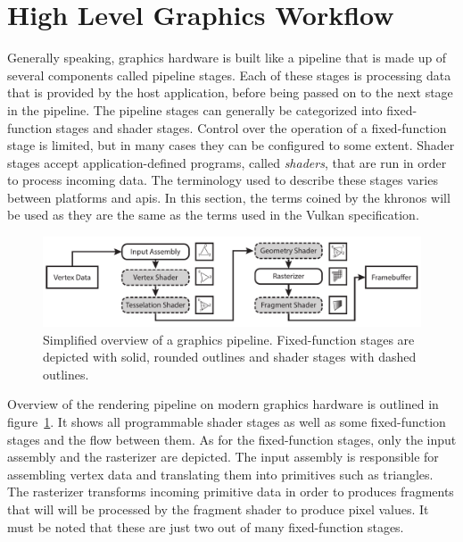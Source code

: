   \section{High Level Graphics Workflow}
    \label{sec:GraphicsWorkflow}
    Generally speaking, graphics hardware is built like a pipeline that is made up of several components called pipeline stages.
    Each of these stages is processing data that is provided by the host application, before being passed on to the next stage in the pipeline.
    The pipeline stages can generally be categorized into fixed-function stages and shader stages.
    Control over the operation of a fixed-function stage is limited, but in many cases they can be configured to some extent.
    Shader stages accept application-defined programs, called \textit{shaders}, that are run in order to process incoming data.
    The terminology used to describe these stages varies between platforms and \glspl{api}.
    In this section, the terms coined by the \gls{khronos} will be used as they are the same as the terms used in the Vulkan specification.

    \begin{figure}
      \label{fig:Rendering_Pipeline_Overview}
      \includegraphics[width=\textwidth]{Main/Images/Rendering_Pipeline_Overview}
      \centering
      \caption{Simplified overview of a graphics pipeline. Fixed-function stages are depicted with solid, rounded outlines and shader stages with dashed outlines.}
    \end{figure}

    Overview of the rendering pipeline on modern graphics hardware is outlined in figure~\ref{fig:Rendering_Pipeline_Overview}.
    It shows all programmable shader stages as well as some fixed-function stages and the flow between them.
    As for the fixed-function stages, only the input assembly and the rasterizer are depicted.
    The input assembly is responsible for assembling vertex data and translating them into primitives such as triangles.
    The rasterizer transforms incoming primitive data in order to produces fragments that will will be processed by the fragment shader to produce pixel values.
    It must be noted that these are just two out of many fixed-function stages.

